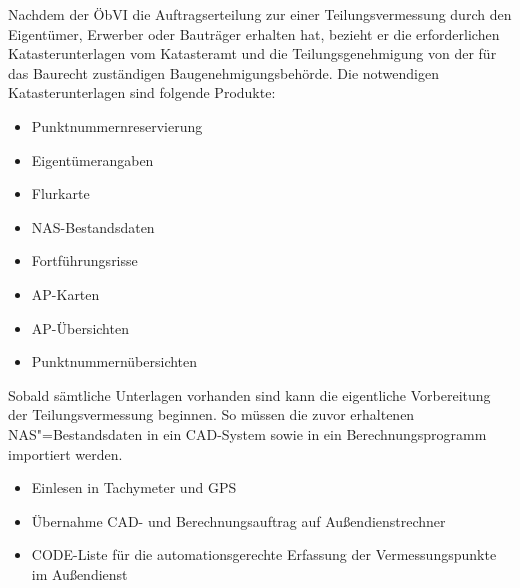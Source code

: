 Nachdem der \ac{ÖbVI} die Auftragserteilung zur einer Teilungsvermessung durch den Eigentümer, Erwerber oder Bauträger erhalten hat, bezieht er die erforderlichen Katasterunterlagen vom Katasteramt und die Teilungsgenehmigung von der für das Baurecht zuständigen Baugenehmigungsbehörde.
Die notwendigen Katasterunterlagen sind folgende Produkte:
\begin{itemize}
	\item Punktnummernreservierung 
	\item Eigentümerangaben
	\item Flurkarte
	\item NAS-Bestandsdaten
	\item Fortführungsrisse
	\item AP-Karten
	\item AP-Übersichten
	\item Punktnummernübersichten
\end{itemize}
Sobald sämtliche Unterlagen vorhanden sind kann die eigentliche Vorbereitung der Teilungsvermessung beginnen. So müssen die zuvor erhaltenen NAS"=Bestandsdaten in ein CAD-System sowie in ein Berechnungsprogramm importiert werden.
\begin{itemize}
	\item Einlesen in Tachymeter und GPS
	\item Übernahme CAD- und Berechnungsauftrag auf Außendienstrechner
	\item CODE-Liste für die automationsgerechte Erfassung der Vermessungspunkte im Außendienst
\end{itemize}


